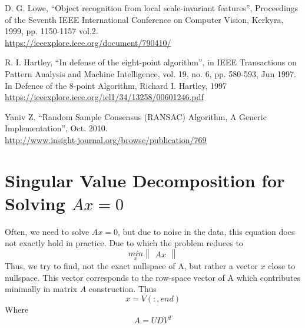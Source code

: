 \documentclass[11pt, a4paper, openany]{article}
\begin{document}
\begin{thebibliography}{5}
D. G. Lowe, ``Object recognition from local scale-invariant features'', Proceedings of the Seventh IEEE International Conference on Computer Vision, Kerkyra, 1999, pp. 1150-1157 vol.2.\\
\url{https://ieeexplore.ieee.org/document/790410/}

\newpage

R. I. Hartley, ``In defense of the eight-point algorithm'', in IEEE Transactions on Pattern Analysis and Machine Intelligence, vol. 19, no. 6, pp. 580-593, Jun 1997.
In Defence of the 8-point Algorithm, Richard I. Hartley, 1997\\
\url{https://ieeexplore.ieee.org/iel1/34/13258/00601246.pdf}

Yaniv Z. ``Random Sample Consensus (RANSAC) Algorithm, A Generic Implementation'', Oct. 2010.\\
\url{http://www.insight-journal.org/browse/publication/769}

\end{thebibliography}
\newpage
\appendix
\section{Singular Value Decomposition for Solving $Ax = 0$}
Often, we need to solve $Ax = 0$, but due to noise in the data, this equation does not exactly hold in practice. Due to which the problem reduces to
\begin{equation}
\underset{x}{min}
\begin{Vmatrix}
Ax
\end{Vmatrix}
\end{equation}
Thus, we try to find, not the exact nullspace of A, but rather a vector $x$ close to nullspace. This vector corresponds to the row-space vector of A which contributes minimally in matrix $A$ construction. Thus
\begin{equation}
x = V(:,end)
\end{equation}
Where
\begin{equation}
A = UDV^{T}
\end{equation}
\end{document}

